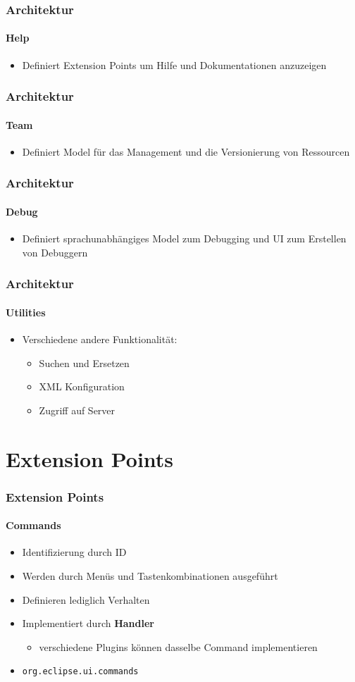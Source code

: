 {\begin{frame}
  \frametitle{Architektur}
  \framesubtitle{Help}
  \begin{itemize}
    \item Definiert Extension Points um Hilfe und Dokumentationen anzuzeigen
  \end{itemize}
\end{frame}

\begin{frame}
  \frametitle{Architektur}
  \framesubtitle{Team}
  \begin{itemize}
    \item Definiert Model für das Management und die Versionierung von Ressourcen
  \end{itemize}
\end{frame}

\begin{frame}
  \frametitle{Architektur}
  \framesubtitle{Debug}
  \begin{itemize}
    \item Definiert sprachunabhängiges Model zum Debugging und UI zum Erstellen von Debuggern
  \end{itemize}
\end{frame}

\begin{frame}
  \frametitle{Architektur}
  \framesubtitle{Utilities}
  \begin{itemize}
    \item Verschiedene andere Funktionalität:
    \begin{itemize}
      \item Suchen und Ersetzen
      \item XML Konfiguration
      \item Zugriff auf Server
    \end{itemize}
  \end{itemize}
\end{frame}

\section{Extension Points}
\begin{frame}
  \frametitle{Extension Points}
  \framesubtitle{Commands}
  \begin{itemize}
    \item Identifizierung durch ID
    \item Werden durch Menüs und Tastenkombinationen ausgeführt
    \item Definieren lediglich Verhalten
    \item Implementiert durch \textbf{Handler}
    \begin{itemize}
      \item verschiedene Plugins können dasselbe Command implementieren
    \end{itemize}
    \item \texttt{org.eclipse.ui.commands}
  \end{itemize}
\end{frame}

}
